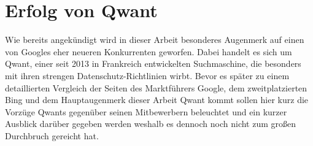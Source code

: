 \chapter{Erfolg von Qwant}\label{ch:qwant-erfolg}

Wie bereits angekündigt wird in dieser Arbeit besonderes Augenmerk auf einen von Googles eher neueren Konkurrenten
geworfen.
Dabei handelt es sich um Qwant, einer seit 2013 in Frankreich entwickelten Suchmaschine, die besonders mit ihren
strengen Datenschutz-Richtlinien wirbt.
Bevor es später zu einem detaillierten Vergleich der Seiten des Marktführers Google, dem zweitplatzierten Bing und dem
Hauptaugenmerk dieser Arbeit Qwant kommt sollen hier kurz die Vorzüge Qwants gegenüber seinen Mitbewerbern beleuchtet
und ein kurzer Ausblick darüber gegeben werden weshalb es dennoch noch nicht zum großen Durchbruch gereicht hat.

